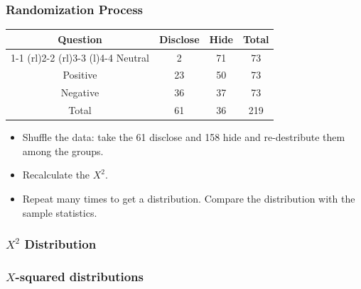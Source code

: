 \documentclass{beamer}
\begin{document}
\begin{frame}
  \frametitle{Randomization Process}
  \begin{table}
    \begin{tabular}{@{}cccc@{}}
      \toprule
      Question & Disclose & Hide & Total \\
      \cmidrule(r){1-1} \cmidrule(rl){2-2} \cmidrule(rl){3-3}
      \cmidrule(l){4-4}
      Neutral & 2 & 71 & 73 \\[0.3em]
      Positive & 23 & 50 & 73 \\[0.3em]
      Negative & 36 & 37 & 73 \\
      Total & 61 & 36 & 219 \\
      \bottomrule
    \end{tabular}
  \end{table}
  \begin{itemize}
    \item[] 
      Shuffle the data: take the 61 disclose and 158 hide and
      re-destribute them among the groups. 
      \vspace{0.5cm}
    \item[] 
      Recalculate the $X^2$.
      \vspace{0.5cm}
    \item[] 
      Repeat many times to get a distribution. Compare the
      distribution with the sample statistics. 
  \end{itemize}
\end{frame}

\begin{frame}
  \frametitle{$X^2$ Distribution}
  \centering
\end{frame}

\begin{frame}
  \frametitle{$X$-squared distributions}
\end{frame}
\end{document}
